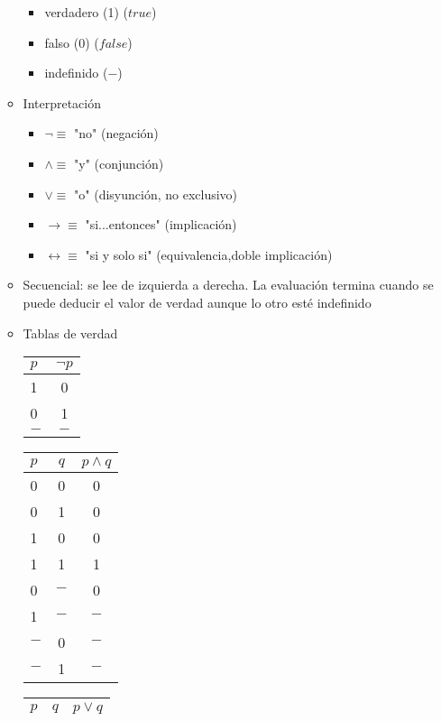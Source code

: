 \documentclass[a4paper,10pt]{article}
\begin{document}
\begin{itemize}
\begin{itemize}
\begin{itemize}
				\item verdadero (1) ($true$)
				\item falso (0) ($false$)
				\item indefinido ($-$)
			\end{itemize}
			\item Interpretación
			\begin{itemize}
				\item $\neg \equiv$ "no" (negación)
				\item $\wedge \equiv$ "y" (conjunción)
				\item $\vee \equiv$ "o" (disyunción, no exclusivo)
				\item $\rightarrow \equiv$ "si...entonces" (implicación)
				\item $\leftrightarrow \equiv$ "si y solo si" (equivalencia,doble implicación) 
			\end{itemize}
			\item Secuencial: se lee de izquierda a derecha. La evaluación termina cuando se puede deducir el valor de verdad aunque lo otro esté indefinido
			\item Tablas de verdad
			\begin{center}
				\begin{tabular}{| l | c | }
     				\hline
     				$p$ & $\neg p$  \\ \hline
     				1 & 0  \\ \hline
     				0 & 1  \\ \hline
     				$-$ & $-$ \\
     				\hline
   				\end{tabular}
   				\begin{tabular}{| l | c | c | }
     				\hline
     				$p$ & $q$ & $p \wedge q$ \\ \hline
     				0 & 0 & 0 \\ \hline
     				0 & 1 & 0 \\ \hline
     				1 & 0 & 0 \\ \hline
     				1 & 1 & 1 \\ \hline
     				0 & $-$ & 0 \\ \hline
     				1 & $-$ & $-$ \\ \hline
     				$-$ & 0 & $-$ \\ \hline
     				$-$ & 1 & $-$ \\ 
     				\hline
   				\end{tabular}
   				\begin{tabular}{| l | c | c | }
     				\hline
     				$p$ & $q$ & $p \vee q$ \\ \hline

\end{tabular}
\end{center}
\end{itemize}
\end{itemize}
\end{document}
